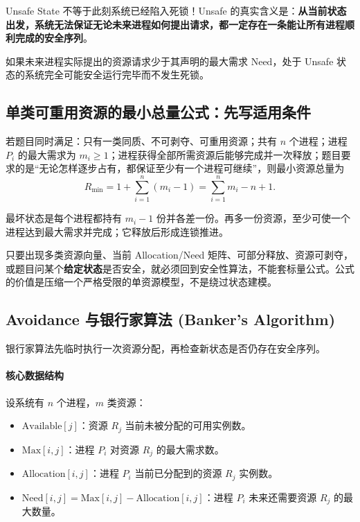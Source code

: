\documentclass[11pt,a4paper]{ctexart}
\newcommand{\kw}[1]{\textbf{#1}}
\begin{document}
\begin{corebox}
Unsafe State 不等于此刻系统已经陷入死锁！Unsafe 的真实含义是：\kw{从当前状态出发，系统无法保证无论未来进程如何提出请求，都一定存在一条能让所有进程顺利完成的安全序列}。

如果未来进程实际提出的资源请求少于其声明的最大需求 $\text{Need}$，处于 Unsafe 状态的系统完全可能安全运行完毕而不发生死锁。
\end{corebox}

\subsection{单类可重用资源的最小总量公式：先写适用条件}

若题目同时满足：只有一类同质、不可剥夺、可重用资源；共有 $n$ 个进程；进程 $P_i$ 的最大需求为 $m_i\ge 1$；进程获得全部所需资源后能够完成并一次释放；题目要求的是“无论怎样逐步占有，都保证至少有一个进程可继续”，则最小资源总量为
\[
\boxed{R_{\min}=1+\sum_{i=1}^{n}(m_i-1)=\sum_{i=1}^{n}m_i-n+1.}
\]

最坏状态是每个进程都持有 $m_i-1$ 份并各差一份。再多一份资源，至少可使一个进程达到最大需求并完成；它释放后形成连锁推进。

\begin{warn}
只要出现多类资源向量、当前 Allocation/Need 矩阵、可部分释放、资源可剥夺，或题目问某个\kw{给定状态}是否安全，就必须回到安全性算法，不能套标量公式。公式的价值是压缩一个严格受限的单资源模型，不是绕过状态建模。
\end{warn}

\subsection{Avoidance 与银行家算法 (Banker's Algorithm)}

银行家算法先临时执行一次资源分配，再检查新状态是否仍存在安全序列。

\paragraph{核心数据结构}
设系统有 $n$ 个进程，$m$ 类资源：
\begin{itemize}
\item $\text{Available}[j]$：资源 $R_j$ 当前未被分配的可用实例数。
\item $\text{Max}[i, j]$：进程 $P_i$ 对资源 $R_j$ 的最大需求数。
\item $\text{Allocation}[i, j]$：进程 $P_i$ 当前已分配到的资源 $R_j$ 实例数。
\item $\text{Need}[i, j] = \text{Max}[i, j] - \text{Allocation}[i, j]$：进程 $P_i$ 未来还需要资源 $R_j$ 的最大数量。
\end{itemize}
\end{document}
